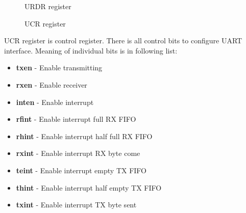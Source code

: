 \begin{figure}[H]
    \centering
    \caption{URDR register}
    \label{fig:URDR_reg}
\end{figure}

\begin{figure}[H]
    \centering
    \caption{UCR register}
    \label{fig:UCR_reg}
\end{figure}

UCR register is control register. There is all control bits to configure UART interface.
Meaning of individual bits is in following list:

\begin{itemize}
    \item \textbf{txen} - Enable transmitting
    \item \textbf{rxen} - Enable receiver
    \item \textbf{inten} - Enable interrupt
    \item \textbf{rfint} - Enable interrupt full RX FIFO
    \item \textbf{rhint} - Enable interrupt half full RX FIFO
    \item \textbf{rxint} - Enable interrupt RX byte come
    \item \textbf{teint} - Enable interrupt empty TX FIFO
    \item \textbf{thint} - Enable interrupt half empty TX FIFO
    \item \textbf{txint} - Enable interrupt TX byte sent
\end{itemize}


